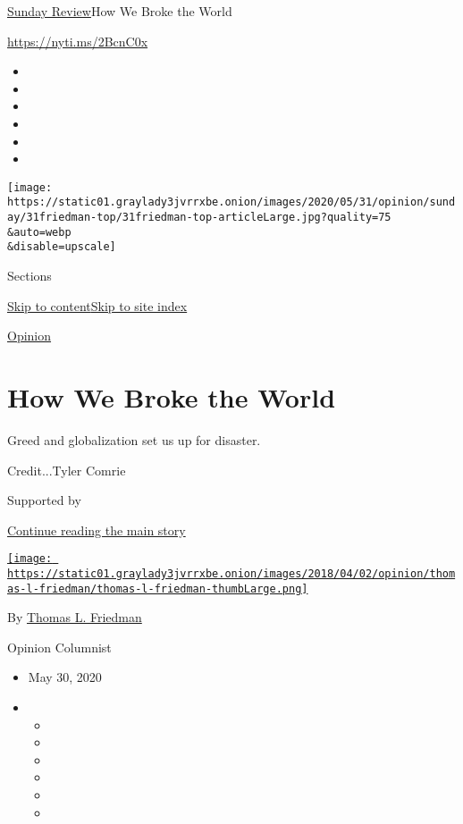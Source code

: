 \href{/section/opinion/sunday}{Sunday Review}\textbar{}How We Broke the
World

\url{https://nyti.ms/2BcnC0x}

\begin{itemize}
\item
\item
\item
\item
\item
\item
\end{itemize}

\texttt{[image: https://static01.graylady3jvrrxbe.onion/images/2020/05/31/opinion/sunday/31friedman-top/31friedman-top-articleLarge.jpg?quality=75\\\&auto=webp\\\&disable=upscale]}

Sections

\protect\hyperlink{site-content}{Skip to
content}\protect\hyperlink{site-index}{Skip to site index}

\href{/section/opinion}{Opinion}

\hypertarget{how-we-broke-the-world}{%
\section{How We Broke the World}\label{how-we-broke-the-world}}

Greed and globalization set us up for disaster.

Credit...Tyler Comrie

Supported by

\protect\hyperlink{after-sponsor}{Continue reading the main story}

\href{https://www.nytimes3xbfgragh.onion/by/thomas-l-friedman}{\texttt{[image: https://static01.graylady3jvrrxbe.onion/images/2018/04/02/opinion/thomas-l-friedman/thomas-l-friedman-thumbLarge.png]}}

By \href{https://www.nytimes3xbfgragh.onion/by/thomas-l-friedman}{Thomas
L. Friedman}

Opinion Columnist

\begin{itemize}
\item
  May 30, 2020
\item
  \begin{itemize}
  \item
  \item
  \item
  \item
  \item
  \item
  \end{itemize}
\end{itemize}

